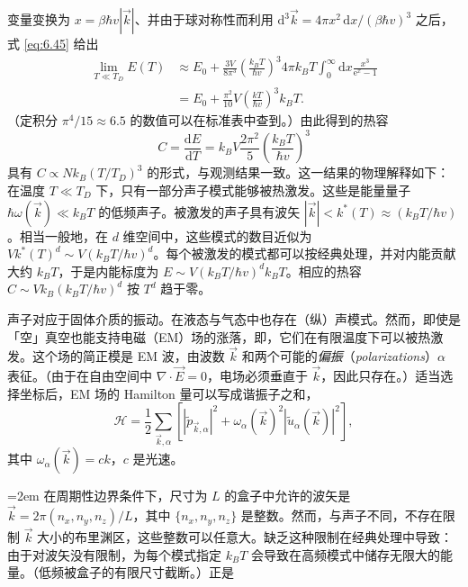 
变量变换为 $x=\beta\hbar v|\vec k|$、并由于球对称性而利用 $\mathrm d^3\vec k=4\pi x^2\,\mathrm dx/(\beta\hbar v)^3$ 之后，式 \eqref{eq:6.45} 给出
\begin{equation}\label{eq:6.47}
\begin{aligned}
\lim_{T\ll T_D}E(T)&\approx E_0+\frac{3V}{8\pi^3}\left(\frac{k_BT}{\hbar v}\right)^3 4\pi k_BT\int_0^\infty\mathrm dx\frac{x^3}{\mathrm e^x-1}\\
&=E_0+\frac{\pi^2}{10}V\left(\frac{kT}{\hbar v}\right)^3k_BT.
\end{aligned}
\end{equation}
（定积分 $\pi^4/15\approx6.5$ 的数值可以在标准表中查到。）由此得到的热容
\begin{equation}\label{eq:6.48}
C=\frac{\mathrm dE}{\mathrm dT}=k_BV\frac{2\pi^2}{5}\left(\frac{k_BT}{\hbar v}\right)^3
\end{equation}
具有 $C\propto Nk_B(T/T_D)^3$ 的形式，与观测结果一致。这一结果的物理解释如下：在温度 $T\ll T_D$ 下，只有一部分声子模式能够被热激发。这些是能量量子 $\hbar\omega(\vec k)\ll k_BT$ 的低频声子。被激发的声子具有波矢 $|\vec k|<k^*(T)\approx(k_BT/\hbar v)$。相当一般地，在 $d$ 维空间中，这些模式的数目近似为 $Vk^*(T)^d\sim V(k_BT/\hbar v)^d$。每个被激发的模式都可以按经典处理，并对内能贡献大约 $k_BT$，于是内能标度为 $E\sim V(k_BT/\hbar v)^dk_BT$。相应的热容 $C\sim Vk_B(k_BT/\hbar v)^d$ 按 $T^d$ 趋于零。


声子对应于固体介质的振动。在液态与气态中也存在（纵）声模式。然而，即使是「空」真空也能支持电磁（EM）场的涨落，即，它们在有限温度下可以被热激发。这个场的简正模是 EM 波，由波数 $\vec k$ 和两个可能的\emph{偏振}（\textit{polarizations}）$\alpha$ 表征。（由于在自由空间中 $\nabla\cdot\vec E=0$，电场必须垂直于 $\vec k$，因此只存在。）适当选择坐标后，EM 场的 Hamilton 量可以写成谐振子之和，
\begin{equation}\label{eq:6.49}
\mathscr H=\frac12\sum_{\vec k,\alpha}\left[\left|\tilde p_{\vec k,\alpha}\right|^2+\omega_\alpha(\vec k)^2\left|\tilde u_\alpha(\vec k)\right|^2\right],
\end{equation}
其中 $\omega_\alpha(\vec k)=ck$，$c$ 是光速。

{\emergencystretch=2em\relax
在周期性边界条件下，尺寸为 $L$ 的盒子中允许的波矢是 $\vec k=2\pi(n_x,n_y,n_z)/L$，其中 $\{n_x,n_y,n_z\}$ 是整数。然而，与声子不同，不存在限制 $\vec k$ 大小的布里渊区，这些整数可以任意大。缺乏这种限制在经典处理中导致：由于对波矢没有限制，为每个模式指定 $k_BT$ 会导致在高频模式中储存无限大的能量。（低频被盒子的有限尺寸截断。）正是\par}

